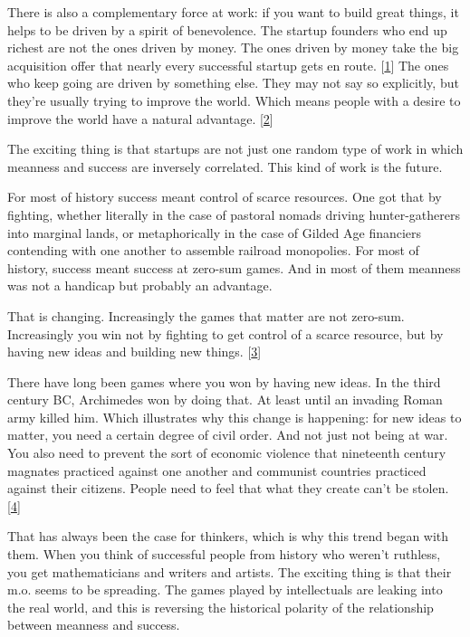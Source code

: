 There is also a complementary force at work: if you want to build great
things, it helps to be driven by a spirit of benevolence. The startup
founders who end up richest are not the ones driven by money. The ones
driven by money take the big acquisition offer that nearly every
successful startup gets en route. {[}\hyperref[f1n]{1}{]} The ones who
keep going are driven by something else. They may not say so explicitly,
but they're usually trying to improve the world. Which means people with
a desire to improve the world have a natural advantage.
{[}\hyperref[f2n]{2}{]}

The exciting thing is that startups are not just one random type of work
in which meanness and success are inversely correlated. This kind of
work is the future.

For most of history success meant control of scarce resources. One got
that by fighting, whether literally in the case of pastoral nomads
driving hunter-gatherers into marginal lands, or metaphorically in the
case of Gilded Age financiers contending with one another to assemble
railroad monopolies. For most of history, success meant success at
zero-sum games. And in most of them meanness was not a handicap but
probably an advantage.

That is changing. Increasingly the games that matter are not zero-sum.
Increasingly you win not by fighting to get control of a scarce
resource, but by having new ideas and building new things.
{[}\hyperref[f3n]{3}{]}

There have long been games where you won by having new ideas. In the
third century BC, Archimedes won by doing that. At least until an
invading Roman army killed him. Which illustrates why this change is
happening: for new ideas to matter, you need a certain degree of civil
order. And not just not being at war. You also need to prevent the sort
of economic violence that nineteenth century magnates practiced against
one another and communist countries practiced against their citizens.
People need to feel that what they create can't be stolen.
{[}\hyperref[f4n]{4}{]}

That has always been the case for thinkers, which is why this trend
began with them. When you think of successful people from history who
weren't ruthless, you get mathematicians and writers and artists. The
exciting thing is that their m.o. seems to be spreading. The games
played by intellectuals are leaking into the real world, and this is
reversing the historical polarity of the relationship between meanness
and success.

